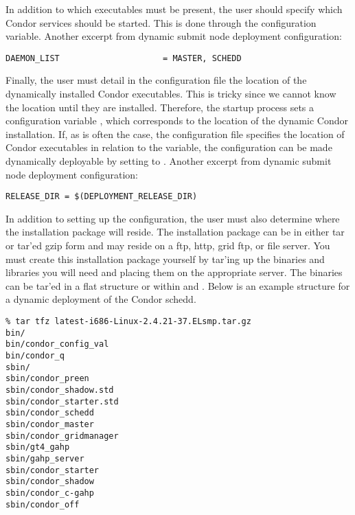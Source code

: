 In addition to which executables must be present, the user should
specify which Condor services should be started.  This is done through
the  configuration variable.  Another excerpt
from dynamic submit node deployment configuration:

\footnotesize
\begin{verbatim}
DAEMON_LIST                     = MASTER, SCHEDD
\end{verbatim}
\normalsize

Finally, the user must detail in the configuration file the location
of the dynamically installed Condor executables.  This is tricky since
we cannot know the location until they are installed.  Therefore, the
startup process sets a configuration variable
, which corresponds to the location of
the dynamic Condor installation.  If, as is often the case, the
configuration file specifies the location of Condor executables in
relation to the  variable, the configuration can
be made dynamically deployable by setting  to
.  Another excerpt from dynamic
submit node deployment configuration:

\footnotesize
\begin{verbatim}
RELEASE_DIR = $(DEPLOYMENT_RELEASE_DIR)
\end{verbatim}
\normalsize

In addition to setting up the configuration, the user must also
determine where the installation package will reside.  The
installation package can be in either tar or tar'ed gzip form and may
reside on a ftp, http, grid ftp, or file server.  You must create this
installation package yourself by tar'ing up the binaries and libraries
you will need and placing them on the appropriate server.  The
binaries can be tar'ed in a flat structure or within  and
.  Below is an example structure for a dynamic deployment
of the Condor schedd.

\footnotesize
\begin{verbatim}
% tar tfz latest-i686-Linux-2.4.21-37.ELsmp.tar.gz
bin/
bin/condor_config_val
bin/condor_q
sbin/
sbin/condor_preen
sbin/condor_shadow.std
sbin/condor_starter.std
sbin/condor_schedd
sbin/condor_master
sbin/condor_gridmanager
sbin/gt4_gahp
sbin/gahp_server
sbin/condor_starter
sbin/condor_shadow
sbin/condor_c-gahp
sbin/condor_off 
\end{verbatim}
\normalsize
